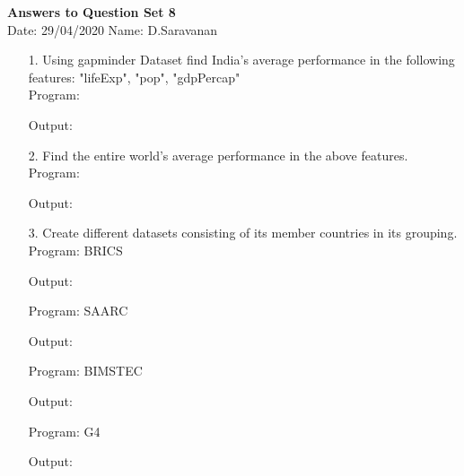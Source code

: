 \documentclass[a4paper,11pt,openright]{report}
\begin{document}
\singlespacing
\pagestyle{plain}

\begin{center}
\textbf{Answers to Question Set 8} \\
Date: 29/04/2020 \hspace{2mm} Name: D.Saravanan
\end{center}

\begin{enumerate}

\item[1.] Using gapminder Dataset find India's average performance in the following
features: "lifeExp", "pop", "gdpPercap" \\

Program:


\vspace{5px}

Output:


\vspace{10px}

\item[2.] Find the entire world's average performance in the above features. \\

Program:


\vspace{5px}

Output:


\vspace{10px}

\item[3.] Create different datasets consisting of its member countries in its grouping. \\

Program: BRICS


\vspace{5px}

Output:


\vspace{10px}

Program: SAARC


\vspace{5px}

\pagebreak

Output:


\vspace{10px}

Program: BIMSTEC


\vspace{5px}

Output:


\vspace{10px}

Program: G4


\vspace{5px}

Output:


\end{enumerate}
\end{document}
